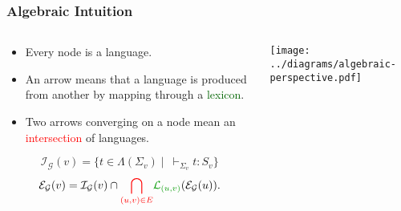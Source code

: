 \documentclass{beamer}
\begin{document}
\begin{frame}
  \frametitle{Algebraic Intuition}

  \begin{columns}[c]
    \begin{column}{0.7\textwidth}
      \begin{block}{}
        \begin{itemize}
        \item Every node is a language.
        \item An arrow means that a language is produced from another by
          mapping through a \textcolor{darkgreen}{lexicon}.
        \item Two arrows converging on a node mean an
          \textcolor{red}{intersection} of languages.
        \end{itemize}
      \end{block}

$$
\mathcal{I}_{\mathcal{G}}(v) = \{t \in \Lambda(\Sigma_v)
\mid\ \vdash_{\Sigma_v} t : S_v\}
$$
$$
\mathcal{E}_{\mathcal{G}}(v) = \mathcal{I}_{\mathcal{G}}(v) \cap
\textcolor{red}{\bigcap_{(u,v) \in E}}
\textcolor{darkgreen}{\mathcal{L}_{(u,v)}}(\mathcal{E}_{\mathcal{G}}(u)).
$$
    \end{column}
    \begin{column}{0.3\textwidth}
      \texttt{[image: ../diagrams/algebraic-perspective.pdf]}
    \end{column}
  \end{columns}

\end{frame}
\end{document}
